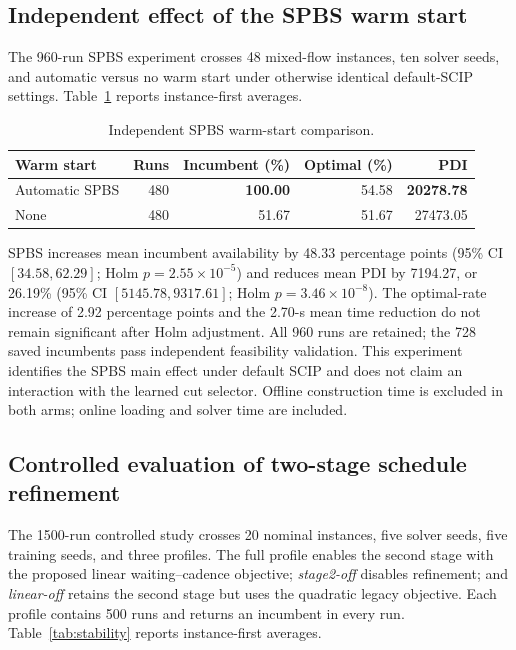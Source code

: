 \documentclass[preprint,12pt,authoryear]{elsarticle}
\begin{document}
\subsection{Independent effect of the SPBS warm start}

The 960-run SPBS experiment crosses 48 mixed-flow instances, ten solver seeds,
and automatic versus no warm start under otherwise identical default-SCIP
settings. Table~\ref{tab:spbs} reports instance-first averages.

\begin{table}[htbp]
\centering
\caption{Independent SPBS warm-start comparison.}
\label{tab:spbs}
\begin{tabular}{lrrrr}
\toprule
Warm start & Runs & Incumbent (\%) & Optimal (\%) & PDI \\
\midrule
Automatic SPBS & 480 & \textbf{100.00} & 54.58 & \textbf{20278.78} \\
None & 480 & 51.67 & 51.67 & 27473.05 \\
\bottomrule
\end{tabular}
\end{table}

SPBS increases mean incumbent availability by 48.33 percentage points (95\%
CI $[34.58,62.29]$; Holm $p=2.55\times10^{-5}$) and reduces mean PDI by
7194.27, or 26.19\% (95\% CI $[5145.78,9317.61]$; Holm
$p=3.46\times10^{-8}$). The optimal-rate increase of 2.92 percentage points
and the 2.70-s mean time reduction do not remain significant after Holm
adjustment. All 960 runs are retained; the 728 saved incumbents pass
independent feasibility validation. This experiment identifies the SPBS main
effect under default SCIP and does not claim an interaction with the learned
cut selector. Offline construction time is excluded in both arms; online
loading and solver time are included.

\subsection{Controlled evaluation of two-stage schedule refinement}

The 1500-run controlled study crosses 20 nominal instances, five solver
seeds, five training seeds, and three profiles. The full profile enables the
second stage with the proposed linear waiting--cadence objective;
\textit{stage2-off} disables refinement; and \textit{linear-off} retains the
second stage but uses the quadratic legacy objective. Each profile contains
500 runs and returns an incumbent in every run. Table~\ref{tab:stability}
reports instance-first averages.
\end{document}
